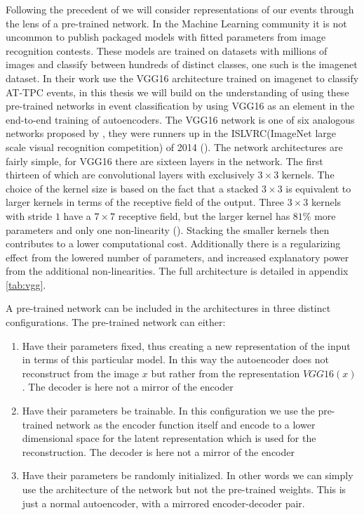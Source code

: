 Following the precedent of  \cite{Kuchera2019} we will consider representations of our events through the lens of a pre-trained network. In the Machine Learning community it is not uncommon to publish packaged models with fitted parameters from image recognition contests. These models are trained on datasets with millions of images and classify between hundreds of distinct classes, one such is the imagenet dataset. In their work \cite{Kuchera2019} use the VGG16 architecture trained on imagenet to classify AT-TPC events, in this thesis we will build on the understanding of using these pre-trained networks in event classification by using VGG16 as an element in the end-to-end training of autoencoders. The VGG16 network is  one of six analogous networks proposed by \citet{Simonyan2014}, they were runners up in the ISLVRC(ImageNet large scale visual recognition competition) of 2014 (\cite{Russakovsky2015}). The network architectures are fairly simple, for VGG16 there are sixteen layers in the network. The first thirteen of which are convolutional layers with exclusively $3 \times 3$ kernels. The choice of the kernel size  is based on the fact that a stacked $3 \times 3$ is equivalent to larger kernels in terms of the receptive field of the output. Three $3 \times 3$ kernels with stride $1$ have a $7 \times 7$ receptive field, but the larger kernel has $81\%$ more parameters and only one non-linearity (\cite{Simonyan2014}). Stacking the smaller kernels then contributes to a lower computational cost. Additionally there is a regularizing effect from the lowered number of parameters, and increased explanatory power from the additional non-linearities. The full architecture is detailed in appendix \ref{tab:vgg}.

A pre-trained network can be included in the architectures in three distinct configurations. The pre-trained network can either:

\begin{enumerate}
\item Have their parameters fixed, thus creating a new representation of the input in terms of this particular model. In this way the autoencoder does not reconstruct from the image $x$ but rather from the representation $VGG16(x)$. The decoder is here not a mirror of the encoder
\item Have their parameters be trainable. In this configuration we use the pre-trained network as the encoder function itself and encode to a lower dimensional space for the latent representation which is used for the reconstruction. The decoder is here not a mirror  of the encoder
\item Have their parameters be randomly initialized. In other words we can simply use the architecture of  the network but not the pre-trained weights. This is just a normal autoencoder, with a mirrored encoder-decoder pair. 
\end{enumerate}

